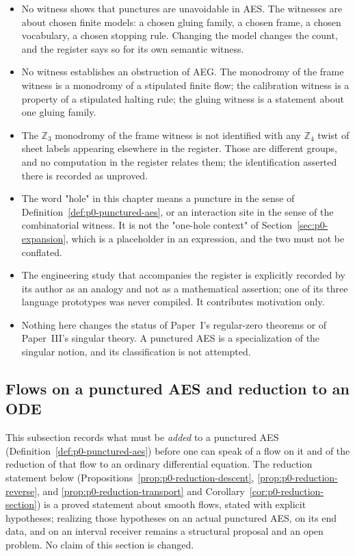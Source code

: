 \begin{itemize}
  \item No witness shows that punctures are unavoidable in AES.  The witnesses
  are about chosen finite models: a chosen gluing family, a chosen frame, a
  chosen vocabulary, a chosen stopping rule.  Changing the model changes the
  count, and the register says so for its own semantic witness.
  \item No witness establishes an obstruction of AEG.  The monodromy of the
  frame witness is a monodromy of a stipulated finite flow; the calibration
  witness is a property of a stipulated halting rule; the gluing witness is a
  statement about one gluing family.
  \item The $\mathbb Z_3$ monodromy of the frame witness is not identified with
  any $\mathbb Z_4$ twist of sheet labels appearing elsewhere in the register.
  Those are different groups, and no computation in the register relates them;
  the identification asserted there is recorded as unproved.
  \item The word "hole" in this chapter means a puncture in the sense of
  Definition~\ref{def:p0-punctured-aes}, or an interaction site in the sense of
  the combinatorial witness.  It is not the "one-hole context" of
  Section~\ref{sec:p0-expansion}, which is a placeholder in an expression, and
  the two must not be conflated.
  \item The engineering study that accompanies the register is explicitly
  recorded by its author as an analogy and not as a mathematical assertion; one
  of its three language prototypes was never compiled.  It contributes
  motivation only.
  \item Nothing here changes the status of Paper~I's regular-zero theorems or of
  Paper~III's singular theory.  A punctured AES is a specialization of the
  singular notion, and its classification is not attempted.
\end{itemize}

\subsection{Flows on a punctured AES and reduction to an ODE}
\label{subsec:p0-punctured-flow-proposal}

This subsection records what must be \emph{added} to a punctured AES
(Definition~\ref{def:p0-punctured-aes}) before one can speak of a flow on it and
of the reduction of that flow to an ordinary differential equation.  The
reduction statement below (Propositions~\ref{prop:p0-reduction-descent},
\ref{prop:p0-reduction-reverse}, and \ref{prop:p0-reduction-transport} and
Corollary~\ref{cor:p0-reduction-section}) is a proved statement about smooth
flows, stated with explicit hypotheses; realizing those hypotheses on an actual
punctured AES, on its end data, and on an interval receiver remains a structural
proposal and an open problem.  No claim of this section is changed.

